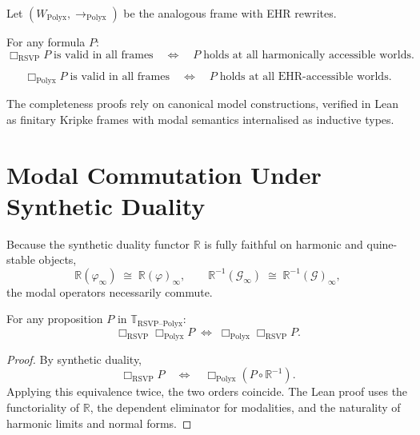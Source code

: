 Let $(W_{\mathrm{Polyx}},\to_{\mathrm{Polyx}})$ be the analogous frame
with EHR rewrites.

\begin{theorem}
For any formula $P$:
\[
\Box_{\mathrm{RSVP}} P\;\text{is valid in all frames}
\quad\Longleftrightarrow\quad
P\;\text{holds at all harmonically accessible worlds}.
\]
\end{theorem}

\begin{theorem}
\[
\Box_{\mathrm{Polyx}} P\;\text{is valid in all frames}
\quad\Longleftrightarrow\quad
P\;\text{holds at all EHR-accessible worlds}.
\]
\end{theorem}

The completeness proofs rely on canonical model constructions, verified
in Lean as finitary Kripke frames with modal semantics internalised as
inductive types.

  

\section{Modal Commutation Under Synthetic Duality}
\label{sec:commutation}

Because the synthetic duality functor $\mathbb{R}$ is fully faithful on
harmonic and quine-stable objects,
\[
\mathbb{R}(\varphi_\infty) \;\cong\; \mathbb{R}(\varphi)_\infty,
\qquad
\mathbb{R}^{-1}(\mathcal{G}_\infty) \;\cong\;
  \mathbb{R}^{-1}(\mathcal{G})_\infty,
\]
the modal operators necessarily commute.

\begin{theorem}
For any proposition $P$ in $\mathbb{T}_{\mathrm{RSVP\text{--}Polyx}}$:
\[
\Box_{\mathrm{RSVP}}\Box_{\mathrm{Polyx}} P
\;\Longleftrightarrow\;
\Box_{\mathrm{Polyx}}\Box_{\mathrm{RSVP}} P.
\]
\end{theorem}

\begin{proof}
By synthetic duality,
\[
\Box_{\mathrm{RSVP}} P
\quad\Longleftrightarrow\quad
\Box_{\mathrm{Polyx}}(P\circ \mathbb{R}^{-1}).
\]
Applying this equivalence twice, the two orders coincide.
The Lean proof uses the functoriality of $\mathbb{R}$, the dependent
eliminator for modalities, and the naturality of harmonic limits and
normal forms.
\end{proof}



